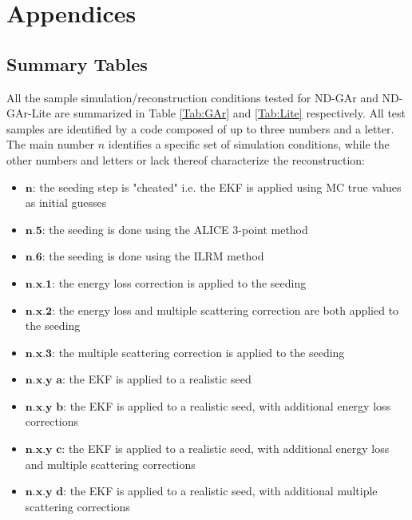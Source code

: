\begin{savequote}[8cm]
\end{savequote}

\chapter{\label{app:1-cardiophys}Appendices}

\minitoc

\section{Summary Tables}
\label{App:Summary_Tables}
All the sample simulation/reconstruction conditions tested for ND-GAr and ND-GAr-Lite are summarized in Table \ref{Tab:GAr} and \ref{Tab:Lite} respectively. All test samples are identified by a code composed of up to three numbers and a letter. The main number $n$ identifies a specific set of simulation conditions, while the other numbers and letters or lack thereof characterize the reconstruction:
\begin{itemize}
    \item $\textbf{n:}$ the seeding step is "cheated" i.e. the EKF is applied using MC true values as initial guesses
    \item $\textbf{n.5:}$ the seeding is done using the ALICE 3-point method
    \item $\textbf{n.6:}$ the seeding is done using the ILRM method
    \item $\textbf{n.x.1:}$ the energy loss correction is applied to the seeding
    \item $\textbf{n.x.2:}$ the energy loss and multiple scattering correction are both applied to the seeding
    \item $\textbf{n.x.3:}$ the multiple scattering correction is applied to the seeding
    \item $\textbf{n.x.y a:}$ the EKF is applied to a realistic seed 
    \item $\textbf{n.x.y b:}$ the EKF is applied to a realistic seed, with additional energy loss corrections
    \item $\textbf{n.x.y c:}$ the EKF is applied to a realistic seed, with additional energy loss and multiple scattering corrections
    \item $\textbf{n.x.y d:}$ the EKF is applied to a realistic seed, with additional multiple scattering corrections   
\end{itemize}
